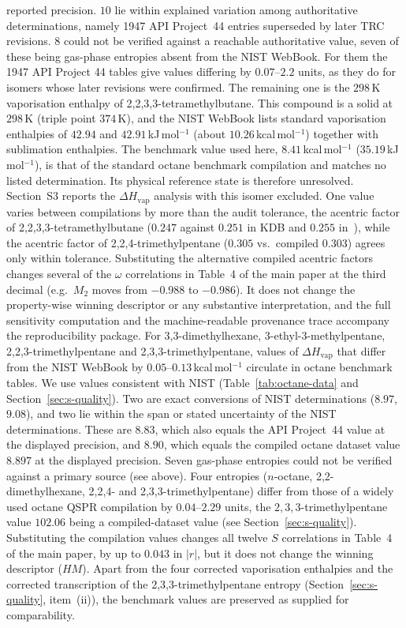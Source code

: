 \documentclass[a5paper, 10pt]{article}
\theoremstyle{plain}
\theoremstyle{remark}
\theoremstyle{definition}
\begin{document}
reported precision. $10$ lie within explained variation among
authoritative determinations, namely 1947 API Project~44 entries
superseded by later TRC revisions. $8$ could not be verified against a
reachable authoritative value, seven of these being gas-phase entropies
absent from the NIST WebBook. For them the 1947 API Project 44 tables
give values differing by $0.07$--$2.2$ units, as they do for isomers
whose later revisions were confirmed. The remaining one is the
$298$\,K vaporisation enthalpy of 2,2,3,3-tetramethylbutane. This
compound is a solid at $298$\,K (triple point $374$\,K), and the NIST
WebBook lists standard vaporisation enthalpies of $42.94$ and
$42.91$\,kJ\,mol$^{-1}$ (about $10.26$\,kcal\,mol$^{-1}$) together with
sublimation enthalpies. The benchmark value used here,
$8.41$\,kcal\,mol$^{-1}$ ($35.19$\,kJ\,mol$^{-1}$), is that of the
standard octane benchmark compilation and matches no listed
determination. Its physical reference state is therefore unresolved.
Section~S3 reports the $\Delta H_{\mathrm{vap}}$ analysis with this
isomer excluded. One value varies between compilations by more than the audit tolerance, the acentric factor of 2,2,3,3-tetramethylbutane ($0.247$ against $0.251$ in KDB and $0.255$ in~\cite{Ediz2017Octane}), while the
acentric factor of 2,2,4-trimethylpentane ($0.305$ vs.\ compiled
$0.303$) agrees only within tolerance. Substituting the alternative
compiled acentric factors changes several of the $\omega$ correlations
in Table~4 of the main paper at the third decimal (e.g.\ $M_2$ moves
from $-0.988$ to $-0.986$). It does not change the property-wise winning
descriptor or any substantive interpretation, and the full sensitivity
computation and the machine-readable provenance trace accompany the
reproducibility package. For 3,3-dimethylhexane,
3-ethyl-3-methylpentane, 2,2,3-trimethylpentane and
2,3,3-trimethylpentane, values of $\Delta H_{\mathrm{vap}}$ that differ
from the NIST WebBook by $0.05$--$0.13$\,kcal\,mol$^{-1}$ circulate in
octane benchmark tables. We use values consistent with NIST
(Table~\ref{tab:octane-data} and Section~\ref{sec:s-quality}). Two are exact conversions of NIST
determinations ($8.97$, $9.08$), and two lie within the span or stated
uncertainty of the NIST determinations. These are $8.83$, which also
equals the API Project~44 value at the displayed precision, and $8.90$,
which equals the compiled octane dataset value $8.897$ at the displayed
precision. Seven gas-phase entropies could not be verified against a
primary source (see above). Four entropies ($n$-octane,
2,2-dimethylhexane, 2,2,4- and 2,3,3-trimethylpentane) differ from
those of a widely used octane QSPR compilation by $0.04$--$2.29$ units,
the $2,3,3$-trimethylpentane value $102.06$ being a compiled-dataset
value (see Section~\ref{sec:s-quality}). Substituting the compilation values
changes all twelve $S$ correlations in Table~4 of the main paper, by up
to $0.043$ in $|r|$, but it does not change the winning descriptor
($HM$). Apart from the four corrected vaporisation enthalpies and the
corrected transcription of the 2,3,3-trimethylpentane entropy
(Section~\ref{sec:s-quality}, item~(ii)), the benchmark values are
preserved as supplied for comparability.
\end{document}
